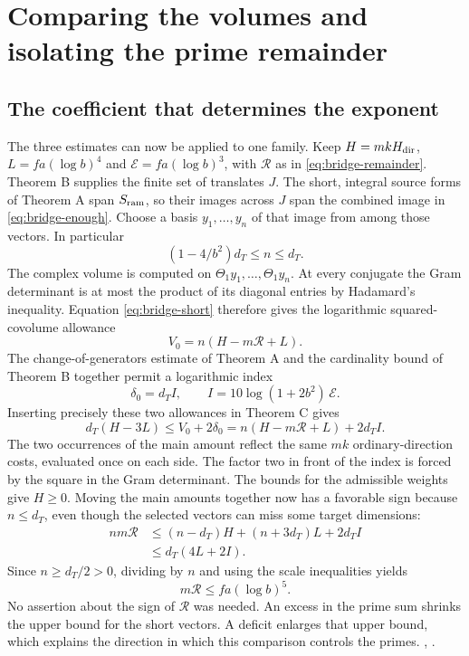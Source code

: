 \section{Comparing the volumes and isolating the prime remainder}\label{sec:bridge-closure}

\subsection{The coefficient that determines the exponent}

The three estimates can now be applied to one family. Keep \(H=mkH_{\rm dir}\), \(L=fa(\log b)^4\) and \(\mathcal E=fa(\log b)^3\), with \(\mathcal R\) as in \eqref{eq:bridge-remainder}. Theorem B supplies the finite set of translates \(J\). The short, integral source forms of Theorem A span \(S_{\rm ram}\), so their images across \(J\) span the combined image in \eqref{eq:bridge-enough}. Choose a basis \(y_1,\ldots,y_n\) of that image from among those vectors. In particular
\[
          (1-4/b^2)d_T\le n\le d_T .
\]
The complex volume is computed on \(\Theta_1 y_1,\ldots,\Theta_1 y_n\). At every conjugate the Gram determinant is at most the product of its diagonal entries by Hadamard's inequality. Equation \eqref{eq:bridge-short} therefore gives the logarithmic squared-covolume allowance
\[
             V_0=n(H-m\mathcal R+L).
\]
The change-of-generators estimate of Theorem A and the cardinality bound of Theorem B together permit a logarithmic index
\[
  \delta_0=d_T I,\qquad I=10\log(1+2b^2)\,\mathcal E.
\]
Inserting precisely these two allowances in Theorem C gives
\[
 d_T(H-3L)\le V_0+2\delta_0=n(H-m\mathcal R+L)+2d_T I .
\]
The two occurrences of the main amount reflect the same \(mk\) ordinary-direction costs, evaluated once on each side. The factor two in front of the index is forced by the square in the Gram determinant. The bounds for the admissible weights give \(H\ge0\). Moving the main amounts together now has a favorable sign because \(n\le d_T\), even though the selected vectors can miss some target dimensions:
\begin{align*}
 nm\mathcal R
   &\le (n-d_T)H+(n+3d_T)L+2d_T I\\
   &\le d_T(4L+2I).
\end{align*}
Since \(n\ge d_T/2>0\), dividing by \(n\) and using the scale inequalities yields
\begin{equation}\label{eq:bridge-star}
                   m\mathcal R\le fa(\log b)^5.
\end{equation}
No assertion about the sign of \(\mathcal R\) was needed. An excess in the prime sum shrinks the upper bound for the short vectors. A deficit enlarges that upper bound, which explains the direction in which this comparison controls the primes. , .

